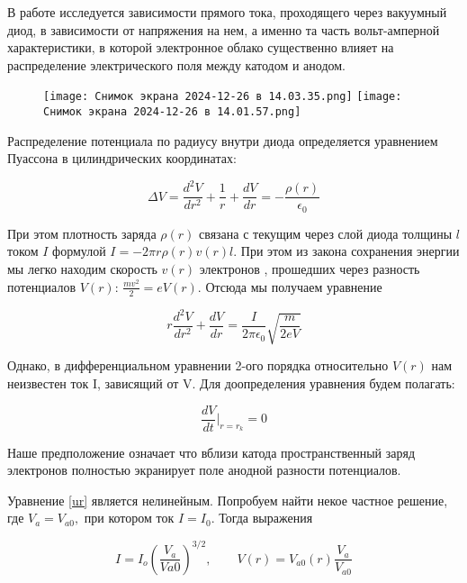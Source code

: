 \documentclass[a4paper,12pt]{article}
\theoremstyle{definition}
\begin{document}
В работе исследуется зависимости прямого тока, проходящего через вакуумный диод, в зависимости от напряжения на нем, а именно та часть вольт-амперной характеристики, в которой электронное облако существенно влияет на распределение электрического поля между катодом и анодом.

\begin{figure}[H]
    \centering
    \texttt{[image: Снимок экрана 2024-12-26 в 14.03.35.png]}
    \texttt{[image: Снимок экрана 2024-12-26 в 14.01.57.png]}
    
\end{figure}


Распределение потенциала по радиусу внутри диода определяется уравнением Пуассона в цилиндрических координатах:

\begin{equation}\label{}
\Delta V = \dfrac{d^2V}{dr^2} + \dfrac{1}{r} + \dfrac{dV}{dr} = - \dfrac{\rho(r)}{\epsilon_0}
\end{equation}

При этом плотность заряда $ \rho(r) $ связана с текущим через слой диода толщины $ l $ током $ I $ формулой $ I = -2\pi r \rho(r)v(r)l$. При этом из закона сохранения энергии мы легко находим скорость $ v(r) $ электронов , прошедших через разность потенциалов $ V(r) $: $ \frac{mv^2}{2} = eV(r) $.  Отсюда мы получаем уравнение 

\begin{equation}\label{ur}
r \dfrac{d^2V}{dr^2} + \dfrac{dV}{dr} = \dfrac{I}{2\pi\epsilon_0}\sqrt{\dfrac{m}{2eV}}
\end{equation}

Однако, в дифференциальном уравнении 2-ого порядка относительно $ V(r) $ нам неизвестен ток I, зависящий от V. Для доопределения уравнения будем полагать:

\begin{equation}\label{usl}
\dfrac{dV}{dt}\bigg |_{r=r_k} = 0
\end{equation} 

Наше предположение означает что вблизи катода пространственный заряд электронов полностью экранирует поле анодной разности потенциалов.

Уравнение \eqref{ur} является нелинейным. Попробуем  найти некое частное решение, где $ V_a = V_{a0}, $ при котором ток $ I = I_0 $. Тогда выражения 

\begin{equation}\label{}
I = I_o \left( \dfrac{V_a}{V{a0}} \right) ^{3/2}, \qquad V(r) = V_{a0}(r)\dfrac{V_a}{V_{a0}}
\end{equation}
\end{document}
